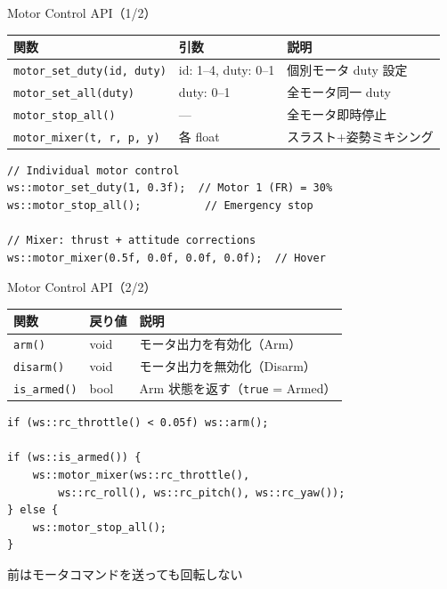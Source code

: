 \begin{frame}[fragile]{Motor Control API（1/2）}
  {\small
  \begin{tabular}{lll}
    \hline
    \textbf{関数} & \textbf{引数} & \textbf{説明} \\
    \hline
    \texttt{motor\_set\_duty(id, duty)} & id: 1--4, duty: 0--1 & 個別モータ duty 設定 \\
    \texttt{motor\_set\_all(duty)}      & duty: 0--1           & 全モータ同一 duty \\
    \texttt{motor\_stop\_all()}         & ---                   & 全モータ即時停止 \\
    \texttt{motor\_mixer(t, r, p, y)}   & 各 float             & スラスト+姿勢ミキシング \\
    \hline
  \end{tabular}
  }

  \vspace{0.3em}

  \begin{lstlisting}[style=sfcpp, basicstyle=\ttfamily\scriptsize]
// Individual motor control
ws::motor_set_duty(1, 0.3f);  // Motor 1 (FR) = 30%
ws::motor_stop_all();          // Emergency stop

// Mixer: thrust + attitude corrections
ws::motor_mixer(0.5f, 0.0f, 0.0f, 0.0f);  // Hover
  \end{lstlisting}
\end{frame}

\begin{frame}[fragile]{Motor Control API（2/2）}
  {\small
  \begin{tabular}{lll}
    \hline
    \textbf{関数} & \textbf{戻り値} & \textbf{説明} \\
    \hline
    \texttt{arm()}       & void & モータ出力を有効化（Arm） \\
    \texttt{disarm()}    & void & モータ出力を無効化（Disarm） \\
    \texttt{is\_armed()} & bool & Arm 状態を返す（\texttt{true} = Armed） \\
    \hline
  \end{tabular}
  }

  \vspace{0.3em}

  \begin{lstlisting}[style=sfcpp, basicstyle=\ttfamily\scriptsize]
if (ws::rc_throttle() < 0.05f) ws::arm();

if (ws::is_armed()) {
    ws::motor_mixer(ws::rc_throttle(),
        ws::rc_roll(), ws::rc_pitch(), ws::rc_yaw());
} else {
    ws::motor_stop_all();
}
  \end{lstlisting}

  \vspace{0.2em}
  {\footnotesize {}  前はモータコマンドを送っても回転しない}
\end{frame}

